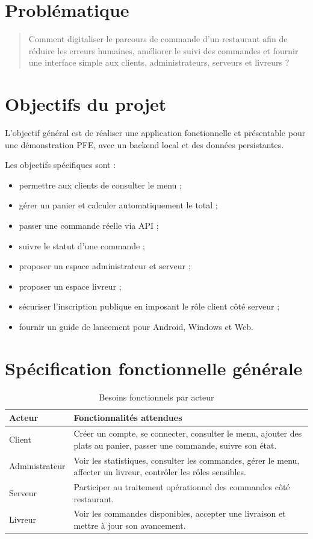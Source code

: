 \documentclass[12pt,a4paper]{report}
\begin{document}
\section{Problématique}
\begin{quote}
Comment digitaliser le parcours de commande d'un restaurant afin de réduire les erreurs humaines, améliorer le suivi des commandes et fournir une interface simple aux clients, administrateurs, serveurs et livreurs ?
\end{quote}

\section{Objectifs du projet}
L'objectif général est de réaliser une application fonctionnelle et présentable pour une démonstration PFE, avec un backend local et des données persistantes.

Les objectifs spécifiques sont :
\begin{itemize}
  \item permettre aux clients de consulter le menu ;
  \item gérer un panier et calculer automatiquement le total ;
  \item passer une commande réelle via API ;
  \item suivre le statut d'une commande ;
  \item proposer un espace administrateur et serveur ;
  \item proposer un espace livreur ;
  \item sécuriser l'inscription publique en imposant le rôle client côté serveur ;
  \item fournir un guide de lancement pour Android, Windows et Web.
\end{itemize}

\section{Spécification fonctionnelle générale}
\begin{longtable}{p{4cm}p{10cm}}
\caption{Besoins fonctionnels par acteur}\\
\toprule
\textbf{Acteur} & \textbf{Fonctionnalités attendues}\\
\midrule
Client & Créer un compte, se connecter, consulter le menu, ajouter des plats au panier, passer une commande, suivre son état.\\
Administrateur & Voir les statistiques, consulter les commandes, gérer le menu, affecter un livreur, contrôler les rôles sensibles.\\
Serveur & Participer au traitement opérationnel des commandes côté restaurant.\\
Livreur & Voir les commandes disponibles, accepter une livraison et mettre à jour son avancement.\\
\bottomrule
\end{longtable}
\end{document}
